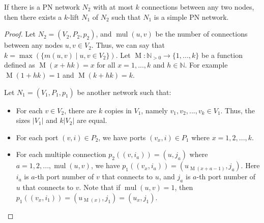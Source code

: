 \begin{lemma} \label{lem:lcl_unsolvability:from_klift_to_simple}
    If there is a PN network $N_2$ with at most $k$ connections between any two nodes, then there exists a $k$-lift $N_1$ of $N_2$ such that $N_1$ is a simple PN network.
\end{lemma}
\begin{proof}
    Let $N_2=(V_2, P_2, p_2)$, and $\operatorname{mul}(u, v)$ be the number of connections between any nodes $u, v \in V_2$.
    Thus, we can say that $k = \max (\{ m(u, v) \mid u, v \in V_2\} )$.
    Let $\operatorname{M}: \mathbb{N}_{> 0} \rightarrow \{1, ..., k\}$ be a function defined as $\operatorname{M}(x+hk) = x$ for all $x = 1, ..., k$ and $h\in \mathbb{N}$.
    For example $\operatorname{M}(1 + hk) = 1$ and $\operatorname{M}(k + hk) = k$.

    Let $N_1=(V_1, P_1, p_1)$ be another network such that:
    \begin{itemize}
        \item For each $v \in V_2$, there are $k$ copies in $V_1$, namely $v_1, v_2, ..., v_k \in V_1$.
        Thus, the sizes $|V_1|$ and $k|V_2|$ are equal.
        \item For each port $(v, i) \in P_2$, we have ports $(v_x, i) \in P_1$ where $x=1, 2, ..., k$.
        \item For each multiple connection $p_2((v, i_a)) = (u, j_a)$ where $a = 1, 2, ..., \operatorname{mul}(u, v)$, we have $p_1((v_{x}, i_a)) = (u_{\operatorname{M}(x+a-1)}, j_a)$.
        Here $i_a$ is $a$-th port number of $v$ that connects to $u$, and $j_a$ is $a$-th port number of $u$ that connects to $v$.
        Note that if $\operatorname{mul}(u, v) = 1$, then $p_1((v_{x}, i_1)) = (u_{\operatorname{M}(x)}, j_1) = (u_{x}, j_1)$.
    \end{itemize}


\end{proof}
